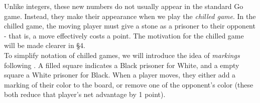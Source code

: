 \documentclass[../math194_paper.tex]{subfiles}
\begin{document}
Unlike integers, these new numbers do not usually appear in the standard Go game. Instead, they 
make their appearance when we play the \textit{chilled game}. In the chilled game, the moving 
player must give a stone as a prisoner to their opponent - that is, a move effectively costs a 
point. The motivation for the chilled game will be made clearer in \S 4.\\

To simplify notation of chilled games, we will introduce the idea of \textit{markings} following 
\cite{berlekamp1994mathematical}. A filled square indicates a Black prisoner for White, and 
a empty square a White prisoner for Black. When a player moves, they either add a marking of
their color to the board, or remove one of the opponent's color (these both reduce that player's
net advantage by 1 point). \\
\end{document}

